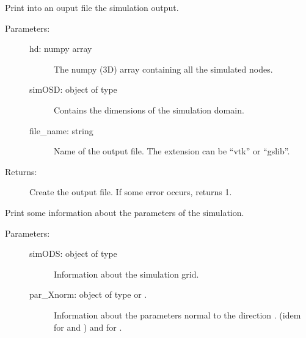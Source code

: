 \documentclass[letterpaper,10pt,english]{sphinxmanual}
\begin{document}
\begin{fulllineitems}
\label{\detokenize{appendices:s2Dcd.s2Dcd.print_result}}
Print into an ouput file the simulation output.
\begin{description}
\item[{Parameters:}] \leavevmode\begin{description}
\item[{hd: numpy array}] \leavevmode
The numpy (3D) array containing all the simulated nodes.

\item[{simOSD: object of type }] \leavevmode
Contains the dimensions of the simulation domain.

\item[{file\_name: string}] \leavevmode
Name of the output file. The extension can be 
“vtk” or “gslib”.

\end{description}

\item[{Returns:}] \leavevmode
Create the output file.
If some error occurs, returns \sphinxhyphen{}1.

\end{description}

\end{fulllineitems}


\begin{fulllineitems}
\label{\detokenize{appendices:s2Dcd.s2Dcd.print_sim_info}}
Print some information about the parameters of the simulation.
\begin{description}
\item[{Parameters:}] \leavevmode\begin{description}
\item[{simODS: object of type }] \leavevmode
Information about the simulation grid.

\item[{par\_Xnorm: object of type  or .}] \leavevmode
Information about the  parameters normal to the
direction .  (idem for  and ) and for .

\end{description}

\end{description}

\end{fulllineitems}
\end{document}
